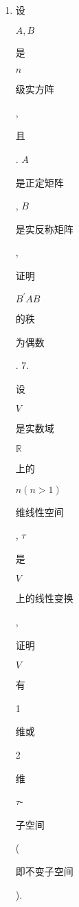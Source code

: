 \documentclass[10pt]{article}
\begin{document}
\begin{enumerate}
  \item \begin{CJK}{UTF8}{mj}设\end{CJK} $A, B$ \begin{CJK}{UTF8}{mj}是\end{CJK} $n$ \begin{CJK}{UTF8}{mj}级实方阵\end{CJK}, \begin{CJK}{UTF8}{mj}且\end{CJK}. $A$ \begin{CJK}{UTF8}{mj}是正定矩阵\end{CJK}, $B$ \begin{CJK}{UTF8}{mj}是实反称矩阵\end{CJK}, \begin{CJK}{UTF8}{mj}证明\end{CJK} $B^{\prime} A B$ \begin{CJK}{UTF8}{mj}的秩\end{CJK} \begin{CJK}{UTF8}{mj}为偶数\end{CJK}. 7. \begin{CJK}{UTF8}{mj}设\end{CJK} $V$ \begin{CJK}{UTF8}{mj}是实数域\end{CJK} $\mathbb{R}$ \begin{CJK}{UTF8}{mj}上的\end{CJK} $n(n>1)$ \begin{CJK}{UTF8}{mj}维线性空间\end{CJK}, $\tau$ \begin{CJK}{UTF8}{mj}是\end{CJK} $V$ \begin{CJK}{UTF8}{mj}上的线性变换\end{CJK}, \begin{CJK}{UTF8}{mj}证明\end{CJK} $V$ \begin{CJK}{UTF8}{mj}有\end{CJK} 1 \begin{CJK}{UTF8}{mj}维或\end{CJK} 2 \begin{CJK}{UTF8}{mj}维\end{CJK} $\tau$-\begin{CJK}{UTF8}{mj}子空间\end{CJK} (\begin{CJK}{UTF8}{mj}即不变子空间\end{CJK}).


\end{enumerate}
\end{document}
